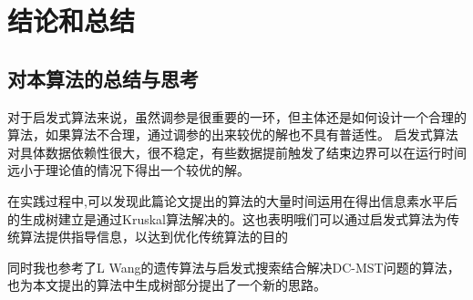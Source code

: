 \chapter{结论和总结}
\section{对本算法的总结与思考}
对于启发式算法来说，虽然调参是很重要的一环，但主体还是如何设计一个合理的算法，如果算法不合理，通过调参的出来较优的解也不具有普适性。
启发式算法对具体数据依赖性很大，很不稳定，有些数据提前触发了结束边界可以在运行时间远小于理论值的情况下得出一个较优的解。
\par
在实践过程中,可以发现此篇论文提出的算法的大量时间运用在得出信息素水平后的生成树建立是通过Kruskal算法解决的。这也表明哦们可以通过启发式算法为传统算法提供指导信息，以达到优化传统算法的目的
\par
同时我也参考了L Wang\cite{Wang2003A}的遗传算法与启发式搜索结合解决DC-MST问题的算法，也为本文提出的算法中生成树部分提出了一个新的思路。